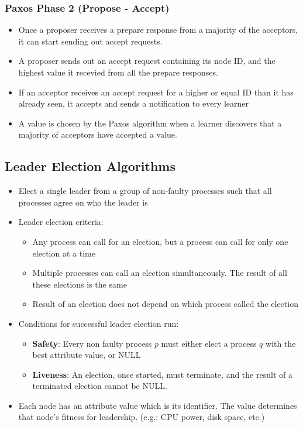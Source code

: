 \documentclass{article}
\begin{document}
\subsubsection{Paxos Phase 2 (Propose - Accept)}
\begin{itemize}
    \item Once a proposer receives a prepare response from a majority of the acceptors, it can start sending out accept requests. 
    
    \item A proposer sends out an accept request containing its node ID, and the highest value it recevied from all the prepare responses. 
    
    \item If an acceptor receives an accept request for a higher or equal ID than it has already seen, it accepts and sends a notification to every learner
    
    \item A value is chosen by the Paxos algorithm when a learner discovers that a majority of acceptors have accepted a value.
\end{itemize}


\subsection{Leader Election Algorithms}
\begin{itemize}
    \item Elect a single leader from a group of non-faulty processes such that all processes agree on who the leader is
    
    \item Leader election criteria:
    \begin{itemize}
        \item Any process can call for an election, but a process can call for only one election at a time
        
        \item Multiple processes can call an election simultaneously. The result of all these elections is the same
        
        \item Result of an election does not depend on which process called the election
    \end{itemize}
    
    \item Conditions for successful leader election run:
    \begin{itemize}
        \item \textbf{Safety}: Every non faulty process $p$ must either elect a process $q$ with the best attribute value, or NULL
        
        \item \textbf{Liveness}: An election, once started, must terminate, and the result of a terminated election cannot be NULL. 
    \end{itemize}
    
    \item Each node has an attribute value which is its identifier. The value determines that node's fitness for leadership. (e.g.: CPU power, disk space, etc.)
\end{itemize}
\end{document}
